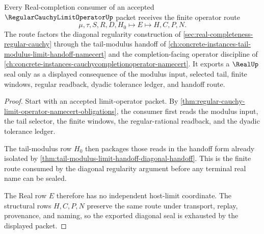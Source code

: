\begin{theorem}
\label{thm:regular-cauchy-limit-operator-diagonal-real-seal}
Every Real-completion consumer of an accepted $\RegularCauchyLimitOperatorUp$ packet receives the finite operator route
$$
\mu,\tau,S,R,D,H_0 \longmapsto E \longmapsto H,C,P,N .
$$
The route factors the diagonal regularity construction of \autoref{sec:real-completeness-regular-cauchy} through the tail-modulus handoff of \autoref{ch:concrete-instances-tail-modulus-limit-handoff-namecert} and the completion-facing operator discipline of \autoref{ch:concrete-instances-cauchycompletionoperator-namecert}. It exports a $\RealUp$ seal only as a displayed consequence of the modulus input, selected tail, finite windows, regular readback, dyadic tolerance ledger, and handoff route.
\end{theorem}
\begin{proof}
Start with an accepted limit-operator packet. By \autoref{thm:regular-cauchy-limit-operator-namecert-obligations}, the consumer first reads the modulus input, the tail selector, the finite windows, the regular-rational readback, and the dyadic tolerance ledger.

The tail-modulus row $H_0$ then packages those reads in the handoff form already isolated by \autoref{thm:tail-modulus-limit-handoff-diagonal-handoff}. This is the finite route consumed by the diagonal regularity argument before any terminal real name can be sealed.

The Real row $E$ therefore has no independent host-limit coordinate. The structural rows $H,C,P,N$ preserve the same route under transport, replay, provenance, and naming, so the exported diagonal seal is exhausted by the displayed packet.
\end{proof}


